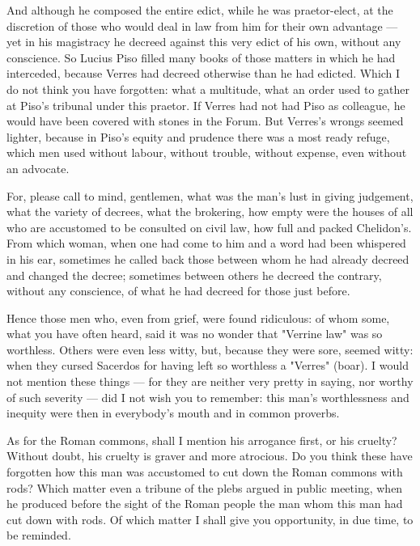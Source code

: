  And although he composed the entire edict, while he was praetor-elect, at the discretion of those who would deal in law from him for their own advantage --- yet in his magistracy he decreed against this very edict of his own, without any conscience. So Lucius Piso filled many books of those matters in which he had interceded, because Verres had decreed otherwise than he had edicted. Which I do not think you have forgotten: what a multitude, what an order used to gather at Piso's tribunal under this praetor. If Verres had not had Piso as colleague, he would have been covered with stones in the Forum. But Verres's wrongs seemed lighter, because in Piso's equity and prudence there was a most ready refuge, which men used without labour, without trouble, without expense, even without an advocate.

 For, please call to mind, gentlemen, what was the man's lust in giving judgement, what the variety of decrees, what the brokering, how empty were the houses of all who are accustomed to be consulted on civil law, how full and packed Chelidon's. From which woman, when one had come to him and a word had been whispered in his ear, sometimes he called back those between whom he had already decreed and changed the decree; sometimes between others he decreed the contrary, without any conscience, of what he had decreed for those just before.

 Hence those men who, even from grief, were found ridiculous: of whom some, what you have often heard, said it was no wonder that "Verrine law" was so worthless. Others were even less witty, but, because they were sore, seemed witty: when they cursed Sacerdos for having left so worthless a "Verres" (boar). I would not mention these things --- for they are neither very pretty in saying, nor worthy of such severity --- did I not wish you to remember: this man's worthlessness and inequity were then in everybody's mouth and in common proverbs.

 As for the Roman commons, shall I mention his arrogance first, or his cruelty? Without doubt, his cruelty is graver and more atrocious. Do you think these have forgotten how this man was accustomed to cut down the Roman commons with rods? Which matter even a tribune of the plebs argued in public meeting, when he produced before the sight of the Roman people the man whom this man had cut down with rods. Of which matter I shall give you opportunity, in due time, to be reminded.

